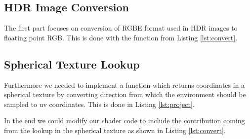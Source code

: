\subsection{HDR Image Conversion}
The first part focuses on conversion of RGBE format used in HDR images to floating point RGB. This is done with the function from Listing \autoref{lst:convert}.

\subsection{Spherical Texture Lookup}
Furthermore we needed to implement a function which returns coordinates in a spherical texture by converting direction from which the environment should be sampled to uv coordinates. This is done in Listing \autoref{lst:project}.

In the end we could modify our shader code to include the contribution coming from the lookup in the spherical texture as shown in Listing \autoref{lst:convert}.

